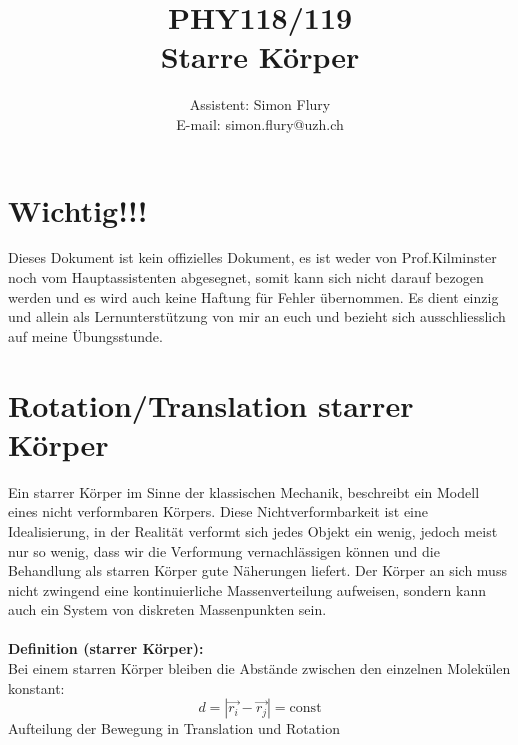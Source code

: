 \documentclass[12pt]{article}
\begin{document}
\title{PHY118/119 \\ {\bf Starre Körper}}
\author{Assistent: Simon Flury \\E-mail: simon.flury@uzh.ch\\ }
\maketitle

\section{Wichtig!!!}
Dieses Dokument ist kein offizielles Dokument, es ist weder von Prof.Kilminster noch vom Hauptassistenten abgesegnet, somit kann sich nicht darauf bezogen werden und es wird auch keine Haftung für Fehler übernommen. Es dient einzig und allein als Lernunterstützung von mir an euch und bezieht sich ausschliesslich auf meine Übungsstunde.

\section{Rotation/Translation starrer Körper}
Ein starrer Körper im Sinne der klassischen Mechanik, beschreibt ein Modell eines nicht verformbaren Körpers. Diese Nichtverformbarkeit ist eine Idealisierung, in der Realität verformt sich jedes Objekt ein wenig, jedoch meist nur so wenig, dass wir die Verformung vernachlässigen können und die Behandlung als starren Körper gute Näherungen liefert. Der Körper an sich muss nicht zwingend eine kontinuierliche Massenverteilung aufweisen, sondern kann auch ein System von diskreten Massenpunkten sein.\\
\\
\textbf{Definition (starrer Körper):}\\
Bei einem starren Körper bleiben die Abstände zwischen den einzelnen Molekülen konstant:
\begin{equation}
d = |\vec{r_i} - \vec{r_j}| = \mathrm{const}
\end{equation}
Aufteilung der Bewegung in Translation und Rotation\\
\clearpage
\end{document}
